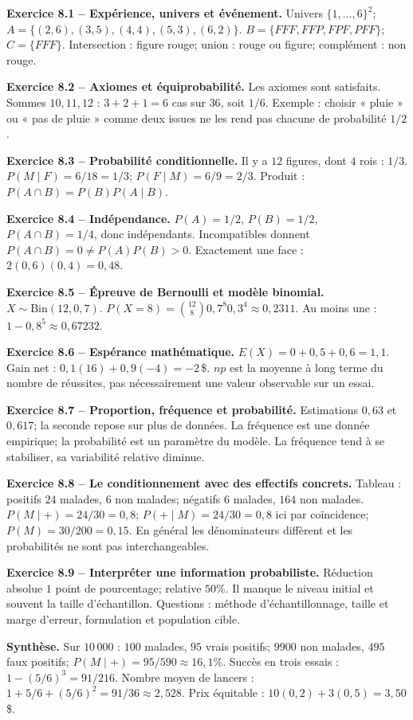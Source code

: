 \begin{answerbox}
\textbf{Exercice 8.1 -- Expérience, univers et événement.} Univers $\{1,\ldots,6\}^2$; $A=\{(2,6),(3,5),(4,4),(5,3),(6,2)\}$. $B=\{FFF,FFP,FPF,PFF\}$; $C=\{FFF\}$. Intersection : figure rouge; union : rouge ou figure; complément : non rouge.\par
\textbf{Exercice 8.2 -- Axiomes et équiprobabilité.} Les axiomes sont satisfaits. Sommes $10,11,12$ : $3+2+1=6$ cas sur $36$, soit $1/6$. Exemple : choisir « pluie » ou « pas de pluie » comme deux issues ne les rend pas chacune de probabilité $1/2$.\par
\textbf{Exercice 8.3 -- Probabilité conditionnelle.} Il y a $12$ figures, dont $4$ rois : $1/3$. $P(M\mid F)=6/18=1/3$; $P(F\mid M)=6/9=2/3$. Produit : $P(A\cap B)=P(B)P(A\mid B)$.\par
\textbf{Exercice 8.4 -- Indépendance.} $P(A)=1/2$, $P(B)=1/2$, $P(A\cap B)=1/4$, donc indépendants. Incompatibles donnent $P(A\cap B)=0\neq P(A)P(B)>0$. Exactement une face : $2(0{,}6)(0{,}4)=0{,}48$.\par
\textbf{Exercice 8.5 -- Épreuve de Bernoulli et modèle binomial.} $X\sim\mathrm{Bin}(12,0{,}7)$. $P(X=8)=\binom{12}{8}0{,}7^8 0{,}3^4\approx0{,}2311$. Au moins une : $1-0{,}8^5\approx0{,}67232$.\par
\textbf{Exercice 8.6 -- Espérance mathématique.} $E(X)=0+0{,}5+0{,}6=1{,}1$. Gain net : $0{,}1(16)+0{,}9(-4)=-2\,$\$. $np$ est la moyenne à long terme du nombre de réussites, pas nécessairement une valeur observable sur un essai.\par
\textbf{Exercice 8.7 -- Proportion, fréquence et probabilité.} Estimations $0{,}63$ et $0{,}617$; la seconde repose sur plus de données. La fréquence est une donnée empirique; la probabilité est un paramètre du modèle. La fréquence tend à se stabiliser, sa variabilité relative diminue.\par
\textbf{Exercice 8.8 -- Le conditionnement avec des effectifs concrets.} Tableau : positifs $24$ malades, $6$ non malades; négatifs $6$ malades, $164$ non malades. $P(M\mid+)=24/30=0{,}8$; $P(+\mid M)=24/30=0{,}8$ ici par coïncidence; $P(M)=30/200=0{,}15$. En général les dénominateurs diffèrent et les probabilités ne sont pas interchangeables.\par
\textbf{Exercice 8.9 -- Interpréter une information probabiliste.} Réduction absolue $1$ point de pourcentage; relative $50\%$. Il manque le niveau initial et souvent la taille d'échantillon. Questions : méthode d'échantillonnage, taille et marge d'erreur, formulation et population cible.\par
\medskip\textbf{Synthèse.} Sur $10\,000$ : $100$ malades, $95$ vrais positifs; $9900$ non malades, $495$ faux positifs; $P(M\mid+)=95/590\approx16{,}1\%$. Succès en trois essais : $1-(5/6)^3=91/216$. Nombre moyen de lancers : $1+5/6+(5/6)^2=91/36\approx2{,}528$. Prix équitable : $10(0{,}2)+3(0{,}5)=3{,}50\,$\$.
\end{answerbox}
